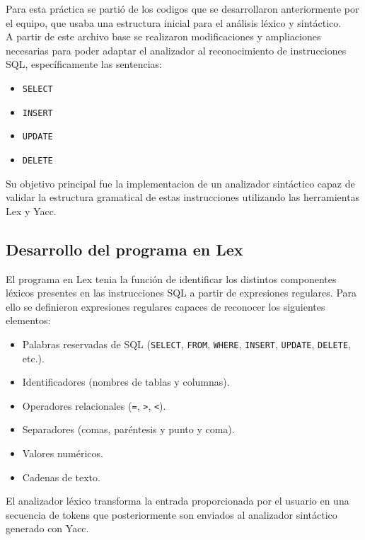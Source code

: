 \documentclass{article}
\begin{document}
Para esta práctica se partió de los codigos que se desarrollaron anteriormente por el equipo, que usaba una estructura inicial para el análisis léxico y sintáctico. \\

A partir de este archivo base se realizaron modificaciones y ampliaciones necesarias para poder adaptar el analizador al reconocimiento de instrucciones SQL, específicamente las sentencias:

\begin{itemize}
    \item \texttt{SELECT}
    \item \texttt{INSERT}
    \item \texttt{UPDATE}
    \item \texttt{DELETE}
\end{itemize}

Su objetivo principal fue la implementacion de un analizador sintáctico capaz de validar la estructura gramatical de estas instrucciones utilizando las herramientas Lex y Yacc.

\subsection{Desarrollo del programa en Lex}

El programa en Lex tenia la función de identificar los distintos componentes léxicos presentes en las instrucciones SQL a partir de expresiones regulares. Para ello se definieron expresiones regulares capaces de reconocer los siguientes elementos:

\begin{itemize}
    \item Palabras reservadas de SQL (\texttt{SELECT}, \texttt{FROM}, \texttt{WHERE}, \texttt{INSERT}, \texttt{UPDATE}, \texttt{DELETE}, etc.).
    \item Identificadores (nombres de tablas y columnas).
    \item Operadores relacionales (\texttt{=}, \texttt{>}, \texttt{<}).
    \item Separadores (comas, paréntesis y punto y coma).
    \item Valores numéricos.
    \item Cadenas de texto.
\end{itemize}

El analizador léxico transforma la entrada proporcionada por el usuario en una secuencia de tokens que posteriormente son enviados al analizador sintáctico generado con Yacc.
\end{document}
